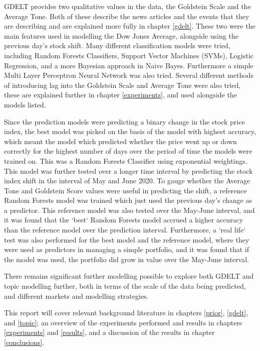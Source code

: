 GDELT provides two qualitative values in the data, the Goldstein Scale and the Average Tone. Both of these describe the news articles and the events that they are describing and are explained more fully in chapter \ref{gdelt}. These two were the main features used in modelling the Dow Jones Average, alongside using the previous day's stock shift. Many different classification models were tried, including Random Forests Classifiers, Support Vector Machines (SVMs), Logistic Regression, and a more Bayesian approach in Naive Bayes. Furthermore a simple Multi Layer Perceptron Neural Network was also tried. Several different methods of introducing lag into the Goldstein Scale and Average Tone were also tried, these are explained further in chapter \ref{experiments}, and used alongside the models listed. 

Since the prediction models were predicting a binary change in the stock price index, the best model was picked on the basis of the model with highest accuracy, which meant the model which predicted whether the price went up or down correctly for the highest number of days over the period of time the models were trained on. This was a Random Forests Classifier using exponential weightings. This model was further tested over a longer time interval by predicting the stock index shift in the interval of May and June 2020. To gauge whether the Average Tone and Goldstein Score values were useful in predicting the shift, a reference Random Forests model was trained which just used the previous day's change as a predictor. This reference model was also tested over the May-June interval, and it was found that the `best` Random Forests model accrued a higher accuracy than the reference model over the prediction interval. Furthermore, a `real life` test was also performed for the best model and the reference model, where they were used as predictors in managing a simple portfolio, and it was found that if the model was used, the portfolio did grow in value over the May-June interval.  

There remains significant further modelling possible to explore both GDELT and topic modelling further, both in terms of the scale of the data being predicted, and different markets and modelling strategies. 

This report will cover relevant background literature in chapters \ref{prior}, \ref{gdelt}, and \ref{topic};  an overview of the experiments performed and results in chapters \ref{experiments} and \ref{results}, and a discussion of the results in chapter \ref{conclusions}.